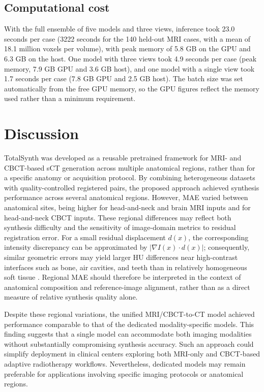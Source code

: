 \documentclass{article}
\begin{document}
\subsection{Computational cost}

With the full ensemble of five models and three views, inference took 23.0 seconds per case (3222 seconds for the 140 held-out MRI cases, with a mean of 18.1 million voxels per volume), with peak memory of 5.8 GB on the GPU and 6.3 GB on the host. One model with three views took 4.9 seconds per case (peak memory, 7.9 GB GPU and 3.6 GB host), and one model with a single view took 1.7 seconds per case (7.8 GB GPU and 2.5 GB host). The batch size was set automatically from the free GPU memory, so the GPU figures reflect the memory used rather than a minimum requirement.


\section{Discussion}

TotalSynth was developed as a reusable pretrained framework for MRI- and CBCT-based sCT generation across multiple anatomical regions, rather than for a specific anatomy or acquisition protocol. By combining heterogeneous datasets with quality-controlled registered pairs, the proposed approach achieved synthesis performance across several anatomical regions. However, MAE varied between anatomical sites, being higher for head-and-neck and brain MRI inputs and for head-and-neck CBCT inputs. These regional differences may reflect both synthesis difficulty and the sensitivity of image-domain metrics to residual registration error. For a small residual displacement $d(x)$, the corresponding intensity discrepancy can be approximated by $|\nabla I(x)\cdot d(x)|$; consequently, similar geometric errors may yield larger HU differences near high-contrast interfaces such as bone, air cavities, and teeth than in relatively homogeneous soft tissue \cite{boussot2026misalignment}. Regional MAE should therefore be interpreted in the context of anatomical composition and reference-image alignment, rather than as a direct measure of relative synthesis quality alone.

Despite these regional variations, the unified MRI/CBCT-to-CT model achieved performance comparable to that of the dedicated modality-specific models. This finding suggests that a single model can accommodate both imaging modalities without substantially compromising synthesis accuracy. Such an approach could simplify deployment in clinical centers exploring both MRI-only and CBCT-based adaptive radiotherapy workflows. Nevertheless, dedicated models may remain preferable for applications involving specific imaging protocols or anatomical regions.
\end{document}
